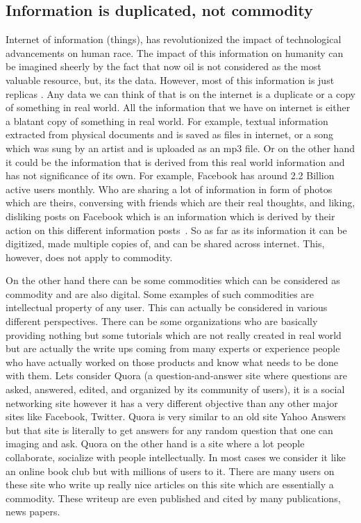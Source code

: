 \subsection{Information is duplicated, not commodity}

Internet of information (things), has revolutionized the impact of
technological advancements on human race. The impact of this
information on humanity can be imagined sheerly by the fact that now
oil is not considered as the most valuable resource, but, its the
data. However, most of this information is just replicas
\cite{economist5}. Any data we can think of that is on the internet is
a duplicate or a copy of something in real world. All the information
that we have on internet is either a blatant copy of something in real
world. For example, textual information extracted from physical
documents and is saved as files in internet, or a song which was sung
by an artist and is uploaded as an mp3 file. Or on the other hand it
could be the information that is derived from this real world
information and has not significance of its own. For example, Facebook
has around 2.2 Billion active users monthly. Who are sharing a lot of
information in form of photos which are theirs, conversing with
friends which are their real thoughts, and liking, disliking posts on
Facebook which is an information which is derived by their action on
this different information posts~\cite{statista6}. So as far as its
information it can be digitized, made multiple copies of, and can be
shared across internet. This, however, does not apply to commodity.


On the other hand there can be some commodities which can be
considered as commodity and are also digital. Some examples of such
commodities are intellectual property of any user. This can actually
be considered in various different perspectives. There can be some
organizations who are basically providing nothing but some tutorials
which are not really created in real world but are actually the write
ups coming from many experts or experience people who have actually
worked on those products and know what needs to be done with them.
Lets consider Quora (a question-and-answer site where
  questions are asked, answered, edited, and organized by its
  community of users), it is a social networking site however it has a
very different objective than any other major sites like Facebook,
Twitter. Quora is very similar to an old site Yahoo Answers but
that site is literally to get answers for any random question that one
can imaging and ask. Quora on the other hand is a site where a lot
people collaborate, socialize with people intellectually. In most
cases we consider it like an online book club but with millions of
users to it. There are many users on these site who write up really
nice articles on this site which are essentially a commodity. These
writeup are even published and cited by many publications, news
papers.

